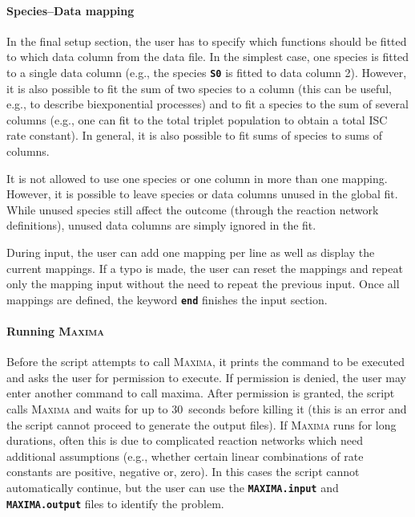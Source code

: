 \documentclass[a4paper,11pt,DIV=15,openany,twoside=false]{scrbook}
\newcommand{\ttt}[1]{\textbf{\texttt{#1}}}
\begin{document}
\paragraph{Species--Data mapping}

In the final setup section, the user has to specify which functions should be fitted to which data column from the data file.
In the simplest case, one species is fitted to a single data column (e.g., the species \ttt{S0} is fitted to data column 2).
However, it is also possible to fit the sum of two species to a column (this can be useful, e.g., to describe biexponential processes) and to fit a species to the sum of several columns (e.g., one can fit to the total triplet population to obtain a total ISC rate constant).
In general, it is also possible to fit sums of species to sums of columns.

It is not allowed to use one species or one column in more than one mapping.
However, it is possible to leave species or data columns unused in the global fit. 
While unused species still affect the outcome (through the reaction network definitions), unused data columns are simply ignored in the fit.

During input, the user can add one mapping per line as well as display the current mappings.
If a typo is made, the user can reset the mappings and repeat only the mapping input without the need to repeat the previous input.
Once all mappings are defined, the keyword \ttt{end} finishes the input section.

\paragraph{Running \textsc{Maxima}}

Before the script attempts to call \textsc{Maxima}, it prints the command to be executed and asks the user for permission to execute.
If permission is denied, the user may enter another command to call maxima.
After permission is granted, the script calls \textsc{Maxima} and waits for up to 30~seconds before killing it (this is an error and the script cannot proceed to generate the output files).
If \textsc{Maxima} runs for long durations, often this is due to complicated reaction networks which need additional assumptions (e.g., whether certain linear combinations of rate constants are positive, negative or, zero).
In this cases the script cannot automatically continue, but the user can use the \ttt{MAXIMA.input} and \ttt{MAXIMA.output} files to identify the problem.
\end{document}
